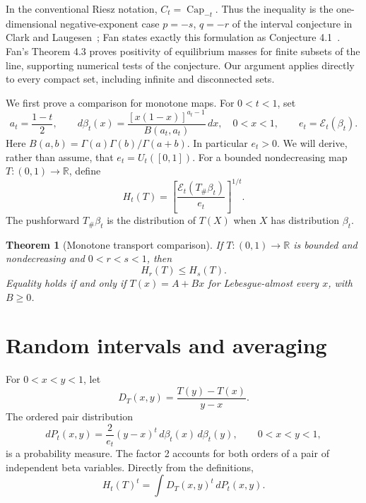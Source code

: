 \documentclass[11pt]{article}
\newtheorem{theorem}{Theorem}[section]
\theoremstyle{remark}
\newcommand{\R}{\mathbb R}
\newcommand{\dd}{\,d}
\newcommand{\push}{_{\#}}
\begin{document}
In the conventional Riesz notation, $C_t=\operatorname{Cap}_{-t}$.
Thus the inequality is the one-dimensional negative-exponent case
$p=-s$, $q=-r$ of the interval conjecture in Clark and
Laugesen~\cite[Conjecture 12]{CL}; Fan states exactly this formulation
as Conjecture 4.1~\cite{Fan}. Fan's Theorem 4.3 proves positivity of
equilibrium masses for finite subsets of the line, supporting numerical
tests of the conjecture. Our argument applies directly to every compact
set, including infinite and disconnected sets.

We first prove a comparison for monotone maps. For $0<t<1$, set
\begin{equation}\label{eq:beta}
 a_t=\frac{1-t}{2},\qquad
 d\beta_t(x)=\frac{[x(1-x)]^{a_t-1}}{B(a_t,a_t)}\dd x,
 \quad 0<x<1,
 \qquad e_t=\mathcal E_t(\beta_t).
\end{equation}
Here $B(a,b)=\Gamma(a)\Gamma(b)/\Gamma(a+b)$. In particular $e_t>0$.
We will derive, rather than assume, that $e_t=U_t([0,1])$.
For a bounded nondecreasing map $T:(0,1)\to\R$, define
\begin{equation}\label{eq:normalized}
 H_t(T)=\left[\frac{\mathcal E_t(T\push\beta_t)}{e_t}\right]^{1/t}.
\end{equation}
The pushforward $T\push\beta_t$ is the distribution of $T(X)$ when
$X$ has distribution $\beta_t$.

\begin{theorem}[Monotone transport comparison]\label{thm:transport}
If $T:(0,1)\to\R$ is bounded and nondecreasing and $0<r<s<1$, then
\begin{equation}\label{eq:transport}
 H_r(T)\leq H_s(T).
\end{equation}
Equality holds if and only if $T(x)=A+Bx$ for Lebesgue-almost every $x$,
with $B\geq0$.
\end{theorem}

\section{Random intervals and averaging}

For $0<x<y<1$, let
\[
 D_T(x,y)=\frac{T(y)-T(x)}{y-x}.
\]
The ordered pair distribution
\begin{equation}\label{eq:pair}
 dP_t(x,y)=\frac{2}{e_t}(y-x)^t\dd\beta_t(x)\dd\beta_t(y),
 \qquad 0<x<y<1,
\end{equation}
is a probability measure. The factor 2 accounts for both orders of a
pair of independent beta variables. Directly from the definitions,
\begin{equation}\label{eq:moment}
 H_t(T)^t=\int D_T(x,y)^t\dd P_t(x,y).
\end{equation}
\end{document}
